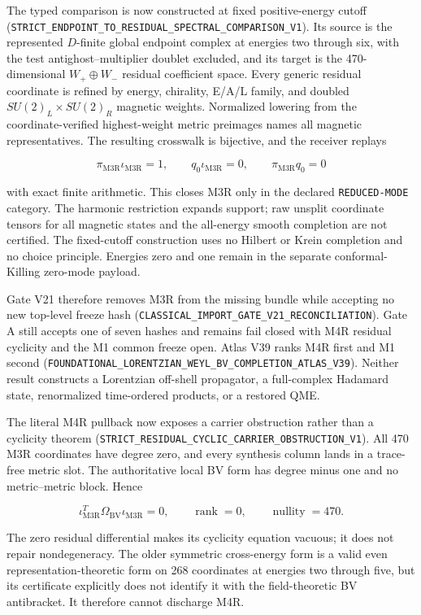 \documentclass[11pt]{article}
\theoremstyle{definition}
\theoremstyle{remark}
\newcommand{\cert}[1]{\nolinkurl{#1}}
\newcommand{\rtype}[1]{\nolinkurl{#1}}
\begin{document}
The typed comparison is now constructed at fixed positive-energy cutoff
(\cert{STRICT_ENDPOINT_TO_RESIDUAL_SPECTRAL_COMPARISON_V1}).  Its source is
the represented \(D\)-finite global endpoint complex at energies two through
six, with the test antighost--multiplier doublet excluded, and its target is
the 470-dimensional \(W_+\oplus W_-\) residual coefficient space.  Every
generic residual coordinate is refined by energy, chirality, E/A/L family,
and doubled \(SU(2)_L\times SU(2)_R\) magnetic weights.  Normalized lowering
from the coordinate-verified highest-weight metric preimages names all
magnetic representatives.  The resulting crosswalk is bijective, and the
receiver replays

\[
  \pi_{\mathrm{M3R}}\iota_{\mathrm{M3R}}=1,
  \qquad
  q_0\iota_{\mathrm{M3R}}=0,
  \qquad
  \pi_{\mathrm{M3R}}q_0=0
\]

with exact finite arithmetic.  This closes M3R only in the declared
\rtype{REDUCED-MODE} category.  The harmonic restriction expands support;
raw unsplit coordinate tensors for all magnetic states and the all-energy
smooth completion are not certified.  The fixed-cutoff construction uses no
Hilbert or Krein completion and no choice principle.  Energies zero and one
remain in the separate conformal-Killing zero-mode payload.

Gate V21 therefore removes M3R from the missing bundle while accepting no new
top-level freeze hash
(\cert{CLASSICAL_IMPORT_GATE_V21_RECONCILIATION}).  Gate A still accepts one
of seven hashes and remains fail closed with M4R residual cyclicity and the M1
common freeze open.  Atlas V39 ranks M4R first and M1 second
(\cert{FOUNDATIONAL_LORENTZIAN_WEYL_BV_COMPLETION_ATLAS_V39}).  Neither result
constructs a Lorentzian off-shell propagator, a full-complex Hadamard state,
renormalized time-ordered products, or a restored QME.

The literal M4R pullback now exposes a carrier obstruction rather than a
cyclicity theorem
(\cert{STRICT_RESIDUAL_CYCLIC_CARRIER_OBSTRUCTION_V1}).  All 470 M3R
coordinates have degree zero, and every synthesis column lands in a
trace-free metric slot.  The authoritative local BV form has degree minus one
and no metric--metric block.  Hence

\[
  \iota_{\mathrm{M3R}}^{T}\Omega_{\mathrm{BV}}
  \iota_{\mathrm{M3R}}=0,
  \qquad \operatorname{rank}=0,
  \qquad \operatorname{nullity}=470.
\]

The zero residual differential makes its cyclicity equation vacuous; it does
not repair nondegeneracy.  The older symmetric cross-energy form is a valid
even representation-theoretic form on 268 coordinates at energies two
through five, but its certificate explicitly does not identify it with the
field-theoretic BV antibracket.  It therefore cannot discharge M4R.
\end{document}
